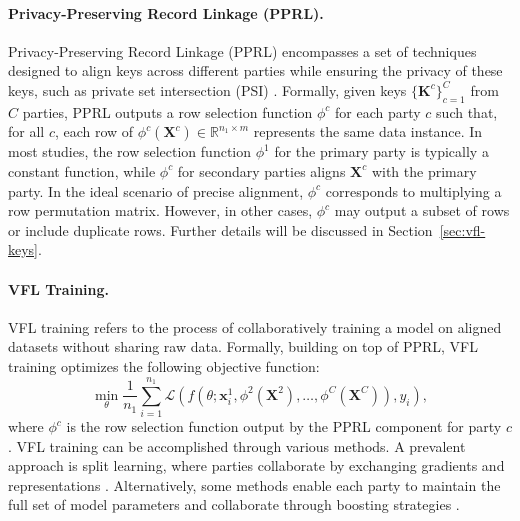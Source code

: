 \paragraph{Privacy-Preserving Record Linkage (PPRL).} Privacy-Preserving Record Linkage (PPRL) encompasses a set of techniques designed to align keys across different parties while ensuring the privacy of these keys, such as private set intersection (PSI) \cite{morales2023private}. Formally, given keys $\{\mathbf{K}^c\}_{c=1}^C$ from $C$ parties, PPRL outputs a row selection function $\phi^c$ for each party $c$ such that, for all $c$, each row of $\phi^c(\mathbf{X}^c) \in \mathbb{R}^{n_1 \times m}$ represents the same data instance. In most studies, the row selection function $\phi^1$ for the primary party is typically a constant function, while $\phi^c$ for secondary parties aligns $\mathbf{X}^c$ with the primary party. In the ideal scenario of precise alignment, $\phi^c$ corresponds to multiplying a row permutation matrix. However, in other cases, $\phi^c$ may output a subset of rows or include duplicate rows. Further details will be discussed in Section~\ref{sec:vfl-keys}.



 





\paragraph{VFL Training.} VFL training refers to the process of collaboratively training a model on aligned datasets without sharing raw data. Formally, building on top of PPRL, VFL training optimizes the following objective function:
\begin{equation}\label{eq:vfl-training-obj}
\min_{\theta} \frac{1}{n_1} \sum_{i=1}^{n_1} \mathcal{L}(f(\theta; \mathbf{x}_i^1, \phi^2(\mathbf{X}^2), \ldots, \phi^C(\mathbf{X}^C)), y_i),
\end{equation}
where $\phi^c$ is the row selection function output by the PPRL component for party $c$. VFL training can be accomplished through various methods. A prevalent approach is split learning, where parties collaborate by exchanging gradients and representations \cite{wang2024unified,nock2021impact}. Alternatively, some methods enable each party to maintain the full set of model parameters and collaborate through boosting strategies \cite{diao2022gal,xian2020assisted}. 





